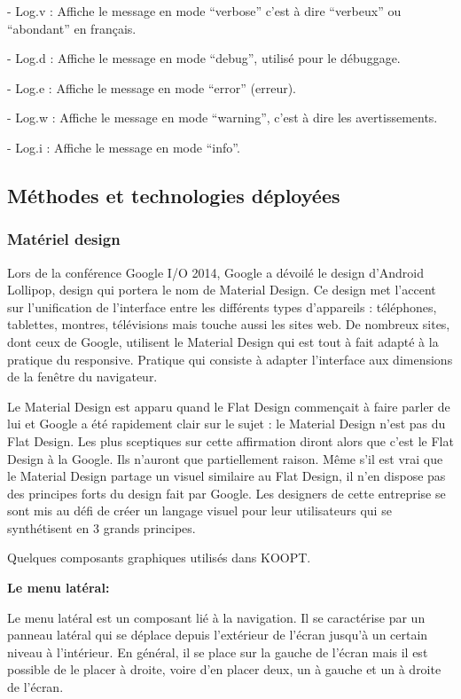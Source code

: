 - Log.v : Affiche le message en mode “verbose” c'est à dire “verbeux” ou “abondant” en français.

- Log.d : Affiche le message en mode “debug”, utilisé pour le débuggage.

- Log.e : Affiche le message en mode “error” (erreur).

- Log.w : Affiche le message en mode “warning”, c'est à dire les avertissements.

- Log.i : Affiche le message en mode “info”.


\subsection{Méthodes et technologies déployées}

\subsubsection{Matériel design}

 Lors de la conférence Google I/O 2014, Google a dévoilé le design d'Android Lollipop, design qui portera le nom de Material Design. Ce design met l'accent sur l'unification de l'interface entre les différents types d'appareils : téléphones, tablettes, montres, télévisions mais touche aussi les sites web. De nombreux sites, dont ceux de Google, utilisent le Material Design qui est tout à fait adapté à la pratique du responsive. Pratique qui consiste à adapter l'interface aux dimensions de la fenêtre du navigateur.\cite{materiel}

Le Material Design est apparu quand le Flat Design commençait à faire parler de lui et Google a été rapidement clair sur le sujet : le Material Design n'est pas du Flat Design. Les plus sceptiques sur cette affirmation diront alors que c'est le Flat Design à la Google. Ils n'auront que partiellement raison. Même s'il est vrai que le Material Design partage un visuel similaire au Flat Design, il n'en dispose pas des principes forts du design fait par Google. Les designers de cette entreprise se sont mis au défi de créer un langage visuel pour leur utilisateurs qui se synthétisent en 3 grands principes.

Quelques composants graphiques utilisés dans KOOPT. 

\textbf{Le menu latéral:}
 

Le menu latéral est un composant lié à la navigation. Il se caractérise par un panneau latéral qui se déplace depuis l'extérieur de l'écran jusqu'à un certain niveau à l'intérieur. En général, il se place sur la gauche de l'écran mais il est possible de le placer à droite, voire d'en placer deux, un à gauche et un à droite de l'écran.




